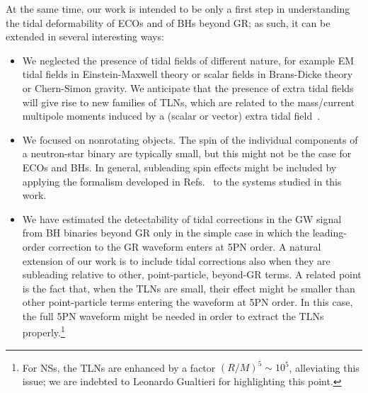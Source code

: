 \documentclass[aps,twocolumn,showpacs,preprintnumbers,nofootinbib,prd,superscriptaddress,groupedaddress,10pt]{revtex4-1}
\begin{document}
%

At the same time, our work is intended to be only a first step in understanding the tidal deformability of ECOs and of BHs beyond GR; as such, it can be extended in several interesting ways:
%
\begin{itemize}
 \item We neglected the presence of tidal fields of different nature, for example EM tidal fields in Einstein-Maxwell theory or scalar fields in Brans-Dicke theory or Chern-Simon gravity. We anticipate that the presence of extra tidal fields will give rise to new families of TLNs, which are related to the mass/current multipole moments induced by a (scalar or vector) extra tidal field~\cite{inprep}.
 \item We focused on nonrotating objects. The spin of the individual components of a neutron-star binary are typically small, but this might not be the case for ECOs and BHs. In general, subleading spin effects might be included by applying the formalism developed in Refs.~\cite{Poisson:2014gka,Pani:2015hfa,Landry:2015zfa,Pani:2015nua} to the systems studied in this work.
 \item We have estimated the detectability of tidal corrections in the GW signal from BH binaries beyond GR only in the simple case in which the leading-order correction to the GR waveform enters at 5PN order. A natural extension of our work is to include tidal corrections also when they are subleading relative to other, point-particle, beyond-GR terms. A related point is the fact that, when the TLNs are small, their effect might be smaller than other point-particle terms entering the waveform at 5PN order. In this case, the full 5PN waveform might be needed in order to extract the TLNs properly.\footnote{For NSs, the TLNs are enhanced by a factor $(R/M)^5\sim 10^5$, alleviating this issue; we are indebted to Leonardo Gualtieri for highlighting this point.}
\end{itemize}
%
\end{document}
